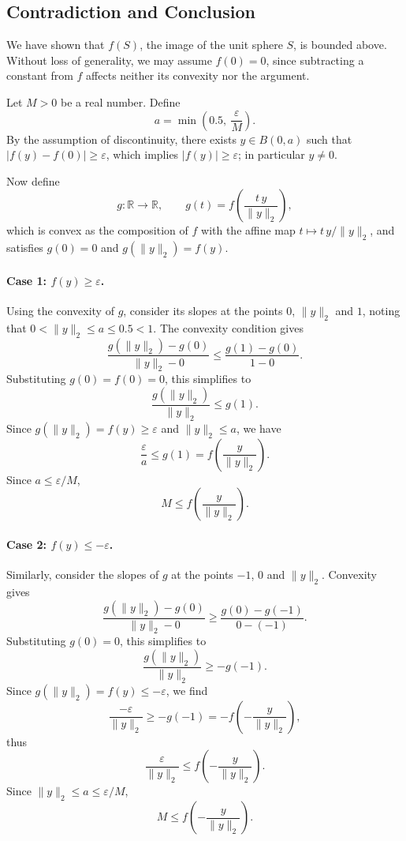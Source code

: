 \documentclass[11pt,a4paper]{article}
\begin{document}
\subsection{Contradiction and Conclusion}
\label{sec:contradiction}

We have shown that $f(S)$, the image of the unit sphere $S$, is bounded above.
Without loss of generality, we may assume $f(0) = 0$, since subtracting a
constant from $f$ affects neither its convexity nor the argument.

Let $M > 0$ be a real number. Define
\[
  a = \min\left( 0.5,\ \frac{\varepsilon}{M} \right).
\]
By the assumption of discontinuity, there exists $y \in B(0, a)$ such that
$|f(y) - f(0)| \ge \varepsilon$, which implies $|f(y)| \ge \varepsilon$; in
particular $y \neq 0$.

Now define
\[
  g : \mathbb{R} \to \mathbb{R}, \qquad
  g(t) = f\!\left( \frac{t\, y}{\|y\|_2} \right),
\]
which is convex as the composition of $f$ with the affine map
$t \mapsto t\,y/\|y\|_2$, and satisfies $g(0) = 0$ and $g(\|y\|_2) = f(y)$.

\paragraph{Case 1: $f(y) \ge \varepsilon$.}
Using the convexity of $g$, consider its slopes at the points $0$, $\|y\|_2$ and
$1$, noting that $0 < \|y\|_2 \le a \le 0.5 < 1$. The convexity condition gives
\[
  \frac{g(\|y\|_2) - g(0)}{\|y\|_2 - 0} \le \frac{g(1) - g(0)}{1 - 0}.
\]
Substituting $g(0) = f(0) = 0$, this simplifies to
\[
  \frac{g(\|y\|_2)}{\|y\|_2} \le g(1).
\]
Since $g(\|y\|_2) = f(y) \ge \varepsilon$ and $\|y\|_2 \le a$, we have
\[
  \frac{\varepsilon}{a} \le g(1) = f\!\left( \frac{y}{\|y\|_2} \right).
\]
Since $a \le \varepsilon / M$,
\[
  M \le f\!\left( \frac{y}{\|y\|_2} \right).
\]

\paragraph{Case 2: $f(y) \le -\varepsilon$.}
Similarly, consider the slopes of $g$ at the points $-1$, $0$ and $\|y\|_2$.
Convexity gives
\[
  \frac{g(\|y\|_2) - g(0)}{\|y\|_2 - 0} \ge \frac{g(0) - g(-1)}{0 - (-1)}.
\]
Substituting $g(0) = 0$, this simplifies to
\[
  \frac{g(\|y\|_2)}{\|y\|_2} \ge -g(-1).
\]
Since $g(\|y\|_2) = f(y) \le -\varepsilon$, we find
\[
  \frac{-\varepsilon}{\|y\|_2} \ge -g(-1) = -f\!\left( -\frac{y}{\|y\|_2} \right),
\]
thus
\[
  \frac{\varepsilon}{\|y\|_2} \le f\!\left( -\frac{y}{\|y\|_2} \right).
\]
Since $\|y\|_2 \le a \le \varepsilon / M$,
\[
  M \le f\!\left( -\frac{y}{\|y\|_2} \right).
\]
\end{document}
